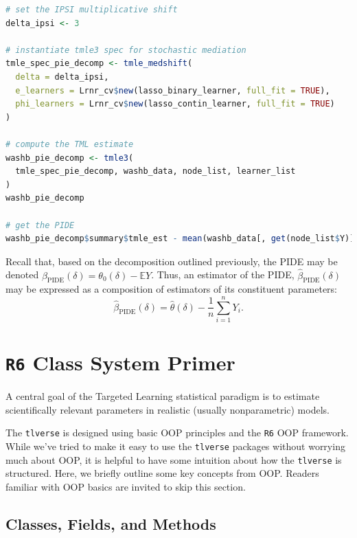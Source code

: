 \documentclass[
  12pt, krantz2,
]{krantz}
\newcommand{\passthrough}[1]{#1}
\theoremstyle{definition}
\theoremstyle{definition}
\theoremstyle{definition}
\newcommand{\1}{\mathbbm{1}}
\begin{document}
\begin{lstlisting}[language=R]
# set the IPSI multiplicative shift
delta_ipsi <- 3

# instantiate tmle3 spec for stochastic mediation
tmle_spec_pie_decomp <- tmle_medshift(
  delta = delta_ipsi,
  e_learners = Lrnr_cv$new(lasso_binary_learner, full_fit = TRUE),
  phi_learners = Lrnr_cv$new(lasso_contin_learner, full_fit = TRUE)
)

# compute the TML estimate
washb_pie_decomp <- tmle3(
  tmle_spec_pie_decomp, washb_data, node_list, learner_list
)
washb_pie_decomp

# get the PIDE
washb_pie_decomp$summary$tmle_est - mean(washb_data[, get(node_list$Y)])
\end{lstlisting}

Recall that, based on the decomposition outlined previously, the PIDE may be
denoted \(\beta_{\text{PIDE}}(\delta) = \theta_0(\delta) - \mathbb{E}Y\). Thus,
an estimator of the PIDE, \(\hat{\beta}_{\text{PIDE}}(\delta)\) may be expressed
as a composition of estimators of its constituent parameters:
\begin{equation*}
  \hat{\beta}_{\text{PIDE}}({\delta}) = \hat{\theta}(\delta) -
  \frac{1}{n} \sum_{i = 1}^n Y_i.
\end{equation*}

\hypertarget{r6}{%
\chapter{\texorpdfstring{\texttt{R6} Class System Primer}{R6 Class System Primer}}\label{r6}}

A central goal of the Targeted Learning statistical paradigm is to estimate
scientifically relevant parameters in realistic (usually nonparametric) models.

The \passthrough{\lstinline!tlverse!} is designed using basic OOP principles and the \passthrough{\lstinline!R6!} OOP framework.
While we've tried to make it easy to use the \passthrough{\lstinline!tlverse!} packages without worrying
much about OOP, it is helpful to have some intuition about how the \passthrough{\lstinline!tlverse!} is
structured. Here, we briefly outline some key concepts from OOP. Readers
familiar with OOP basics are invited to skip this section.

\hypertarget{classes-fields-and-methods}{%
\section{Classes, Fields, and Methods}\label{classes-fields-and-methods}}
\end{document}
